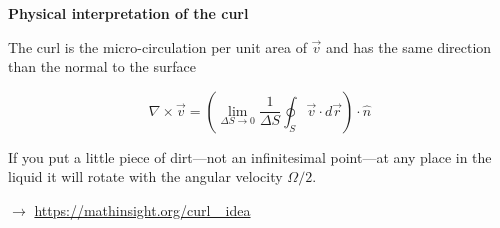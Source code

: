 \documentclass[]{beamer}
\begin{document}


\begin{frame}

\textbf{Physical interpretation of the curl}
\vspace{3mm}

\pause
The curl is the micro-circulation per unit area of $ \vec{v}$ and  has the same direction than the normal to the surface

\pause

 \begin{equation*}
\nabla\times\vec{v}=\left(\lim_{\Delta S\to 0}\frac{1}{\Delta S} \oint_S \vec{v}\cdot d\vec{r}\right)\cdot\hat{n}
\end{equation*}
\vspace{3mm}


\pause
If you put a little piece of dirt—not an infinitesimal point—at any place in the liquid it will rotate with the angular velocity $\Omega/2$.
\vspace{3mm}


\pause

$\rightarrow$ \url{https://mathinsight.org/curl_ idea} 


 \end{frame}







 
\end{document}
